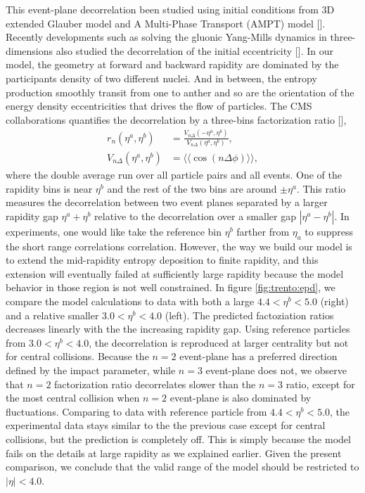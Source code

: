 This event-plane decorrelation been studied using initial conditions from 3D extended Glauber model and A Multi-Phase Transport (AMPT) model [].
Recently developments such as solving the gluonic Yang-Mills dynamics in three-dimensions also studied the decorrelation of the initial eccentricity [].
In our model, the geometry at forward and backward rapidity are dominated by the participants density of two different nuclei.
And in between, the entropy production smoothly transit from one to anther and so are the orientation of the energy density eccentricities that drives the flow of particles.
The CMS collaborations quantifies the decorrelation by a three-bins factorization ratio [],
\begin{eqnarray}
r_n(\eta^a, \eta^b) &= \frac{V_{n\Delta}(-\eta^a, \eta^b)}{V_{n\Delta}(\eta^a, \eta^b)}, \\
V_{n\Delta}(\eta^a, \eta^b) &= \langle\langle \cos(n\Delta\phi) \rangle\rangle,
\end{eqnarray}
where the double average run over all particle pairs and all events.
One of the rapidity bins is near $\eta^b$ and the rest of the two bins are around $\pm\eta^a$.
This ratio measures the decorrelation between two event planes separated by a larger rapidity gap $\eta^a + \eta^b$ relative to the decorrelation over a smaller gap $|\eta^a - \eta^b|$.
In experiments, one would like take the reference bin $\eta^b$ farther from $\eta_a$ to suppress the short range correlations correlation.
However, the way we build our model is to extend the mid-rapidity entropy deposition to finite rapidity, and this extension will eventually failed at sufficiently large rapidity because the model behavior in those region is not well constrained.
In figure \ref{fig:trento:epd}, we compare the model calculations to data with both a large $4.4<\eta^b<5.0$ (right) and a relative smaller $3.0 < \eta^b< 4.0$ (left).
The predicted factoziation ratios decreases linearly with the the increasing rapidity gap.
Using reference particles from $3.0 < \eta^b< 4.0$, the decorrelation is reproduced at larger centrality but not for central collisions.
Because the $n=2$ event-plane has a preferred direction defined by the impact parameter, while $n=3$ event-plane does not, we observe that $n=2$ factorization ratio decorrelates slower than the $n=3$ ratio, except for the most central collision when $n=2$ event-plane is also dominated by fluctuations.
Comparing to data with reference particle from $4.4<\eta^b<5.0$, the experimental data stays similar to the the previous case except for central collisions, but the prediction is completely off.
This is simply because the model fails on the details at large rapidity as we explained earlier.
Given the present comparison, we conclude that the valid range of the model should be restricted to $|\eta| < 4.0$.

